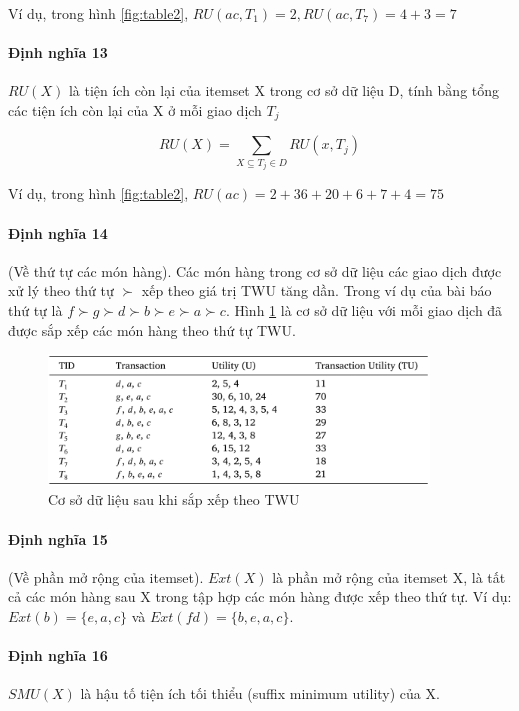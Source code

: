 Ví dụ, trong hình \ref{fig:table2}, $RU(ac, T_1) = 2, RU(ac, T_7) = 4 + 3 = 7 $  

\paragraph{Định nghĩa 13} $RU(X)$ là tiện ích còn lại của itemset X trong cơ sở dữ liệu D, tính bằng tổng các tiện ích còn lại của X ở mỗi giao dịch $T_j$

$$ RU(X) = \sum_{X \subseteq T_j \in D} RU(x, T_j) $$

Ví dụ, trong hình \ref{fig:table2}, $RU(ac) = 2 + 36 + 20 + 6 + 7 + 4 = 75$

\paragraph{Định nghĩa 14} (Về thứ tự các món hàng). Các món hàng trong cơ sở dữ liệu các giao dịch được xử lý theo thứ tự $\succ$ xếp theo giá trị TWU tăng dần. Trong ví dụ của bài báo thứ tự là $ f \succ g \succ d \succ b \succ e \succ a \succ c $. Hình \ref{fig:table5} là cơ sở dữ liệu với mỗi giao dịch đã được sắp xếp các món hàng theo thứ tự TWU. 

\begin{figure}[h]
\centering
\includegraphics[width=0.9\textwidth]{image/table/table5.PNG}
\caption{\label{fig:table5} Cơ sở dữ liệu sau khi sắp xếp theo TWU  }
\end{figure}

\paragraph{Định nghĩa 15} (Về phần mở rộng của itemset). $Ext(X)$ là phần mở rộng của itemset X, là tất cả các món hàng sau X trong tập hợp các món hàng được xếp theo thứ tự. Ví dụ: $Ext(b) = \{ e, a, c \}$ và $Ext(fd) = \{b, e, a, c \}$.

\paragraph{Định nghĩa 16} $SMU(X)$ là hậu tố tiện ích tối thiểu (suffix minimum utility) của X. 

